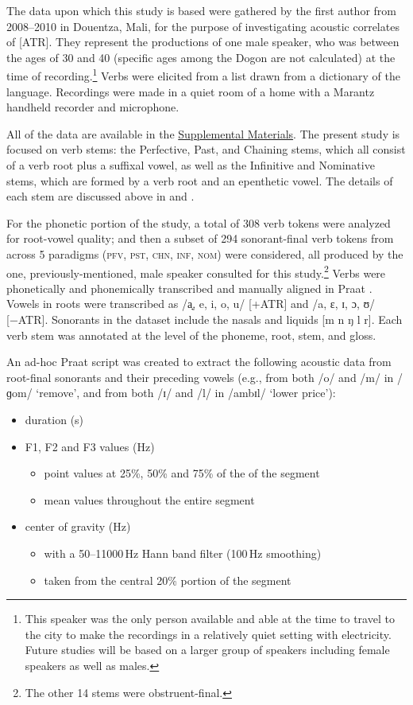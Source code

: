 \documentclass[output=paper,colorlinks,citecolor=brown]{langscibook}
\begin{document}
The data upon which this study is based were gathered by the first author from 2008--2010 in Douentza, Mali, for the purpose of investigating acoustic correlates of [ATR]. They represent the productions of one male speaker, who was between the ages of 30 and 40 (specific ages among the Dogon are not calculated) at the time of recording.\footnote{This speaker was the only person available and able at the time to travel to the city to make the recordings in a relatively quiet setting with electricity. Future studies will be based on a larger group of speakers including female speakers as well as males.} Verbs were elicited from a list drawn from a dictionary of the language. Recordings were made in a quiet room of a home with a Marantz handheld recorder and microphone.

All of the data are available in the \href{https://bang.huma-num.fr/ressources.html}{Supplemental Materials}. The present study is focused on verb stems: the Perfective, Past, and Chaining stems, which all consist of a verb root plus a suffixal vowel, as well as the Infinitive and Nominative stems, which are formed by a verb root and an epenthetic vowel. The details of each stem are discussed above in  and .

For the phonetic portion of the study, a total of 308 verb tokens were analyzed for root-vowel quality; and then a subset of 294 sonorant-final verb tokens from across 5 paradigms (\textsc{pfv, pst, chn, inf, nom}) were considered, all produced by the one, previously-mentioned, male speaker consulted for this study.\footnote{The other 14 stems were obstruent-final.} Verbs were phonetically and phonemically transcribed and manually aligned in Praat \citep{Praat2022}. Vowels in roots were transcribed as /a̘, e, i, o, u/ [+ATR] and /a, ɛ, ɪ, ɔ, ʊ/ [−ATR]. Sonorants in the dataset include the nasals and liquids [m n ŋ l r]. Each verb stem was annotated at the level of the phoneme, root, stem, and gloss.

An ad-hoc Praat script was created to extract the following acoustic data from root-final sonorants and their preceding vowels (e.g., from both /o/ and /m/ in /ɡom/ `remove', and from both /ɪ/ and /l/ in /ambɪl/ `lower price'):
\begin{itemize}
    \item duration (s)
    \item F1, F2 and F3 values (Hz)
    \begin{itemize}
        \item point values at 25\%, 50\% and 75\% of the of the segment
        \item mean values throughout the entire segment
        \end{itemize}
    \item center of gravity (Hz)
    \begin{itemize}
    \item with a 50--11000\,Hz Hann band filter (100\,Hz smoothing)
    \item taken from the central 20\% portion of the segment
    \end{itemize}
\end{itemize}
\end{document}
